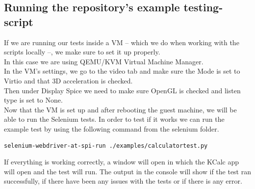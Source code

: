 \subsection{Running the repository's example testing-script}\label{test script}
    If we are running our tests inside a VM -- which we do when working
    with the scripts locally --, we make sure to set it up properly.\\
    In this case we are using QEMU/KVM Virtual Machine Manager.\\

    In the VM's settings, we go to the video tab and make sure
    the Mode is set to Virtio and that 3D acceleration is checked.\\
    Then under Display Spice we need to make sure OpenGL is checked and
    listen type is set to None.\\

    Now that the VM is set up and after rebooting the guest machine, we
    will be able to run the Selenium tests.
    In order to test if it works we can run the example test by using the
    following command from the selenium folder.

    \begin{lstlisting}[language=bash, gobble=8]
        selenium-webdriver-at-spi-run ./examples/calculatortest.py
    \end{lstlisting}
    If everything is working correctly, a window will open in which the
    KCalc app will open and the test will run. The output in the console will show if the test ran successfully, if there have been any issues with the tests or if there is any error.


